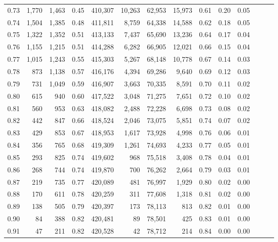 \begin{tabular}{rrrrrrrrrrrrrr}
0.73 &  1,770 &  1,463 &  0.45 &  410,307 &   10,263 &  62,953 &  15,973 &  0.61 &  0.20 &      0.05 \\
0.74 &  1,504 &  1,385 &  0.48 &  411,811 &    8,759 &  64,338 &  14,588 &  0.62 &  0.18 &      0.05 \\
0.75 &  1,322 &  1,352 &  0.51 &  413,133 &    7,437 &  65,690 &  13,236 &  0.64 &  0.17 &      0.04 \\
0.76 &  1,155 &  1,215 &  0.51 &  414,288 &    6,282 &  66,905 &  12,021 &  0.66 &  0.15 &      0.04 \\
0.77 &  1,015 &  1,243 &  0.55 &  415,303 &    5,267 &  68,148 &  10,778 &  0.67 &  0.14 &      0.03 \\
0.78 &    873 &  1,138 &  0.57 &  416,176 &    4,394 &  69,286 &   9,640 &  0.69 &  0.12 &      0.03 \\
0.79 &    731 &  1,049 &  0.59 &  416,907 &    3,663 &  70,335 &   8,591 &  0.70 &  0.11 &      0.02 \\
0.80 &    615 &    940 &  0.60 &  417,522 &    3,048 &  71,275 &   7,651 &  0.72 &  0.10 &      0.02 \\
0.81 &    560 &    953 &  0.63 &  418,082 &    2,488 &  72,228 &   6,698 &  0.73 &  0.08 &      0.02 \\
0.82 &    442 &    847 &  0.66 &  418,524 &    2,046 &  73,075 &   5,851 &  0.74 &  0.07 &      0.02 \\
0.83 &    429 &    853 &  0.67 &  418,953 &    1,617 &  73,928 &   4,998 &  0.76 &  0.06 &      0.01 \\
0.84 &    356 &    765 &  0.68 &  419,309 &    1,261 &  74,693 &   4,233 &  0.77 &  0.05 &      0.01 \\
0.85 &    293 &    825 &  0.74 &  419,602 &      968 &  75,518 &   3,408 &  0.78 &  0.04 &      0.01 \\
0.86 &    268 &    744 &  0.74 &  419,870 &      700 &  76,262 &   2,664 &  0.79 &  0.03 &      0.01 \\
0.87 &    219 &    735 &  0.77 &  420,089 &      481 &  76,997 &   1,929 &  0.80 &  0.02 &      0.00 \\
0.88 &    170 &    611 &  0.78 &  420,259 &      311 &  77,608 &   1,318 &  0.81 &  0.02 &      0.00 \\
0.89 &    138 &    505 &  0.79 &  420,397 &      173 &  78,113 &     813 &  0.82 &  0.01 &      0.00 \\
0.90 &     84 &    388 &  0.82 &  420,481 &       89 &  78,501 &     425 &  0.83 &  0.01 &      0.00 \\
0.91 &     47 &    211 &  0.82 &  420,528 &       42 &  78,712 &     214 &  0.84 &  0.00 &      0.00 \\

\end{tabular}
